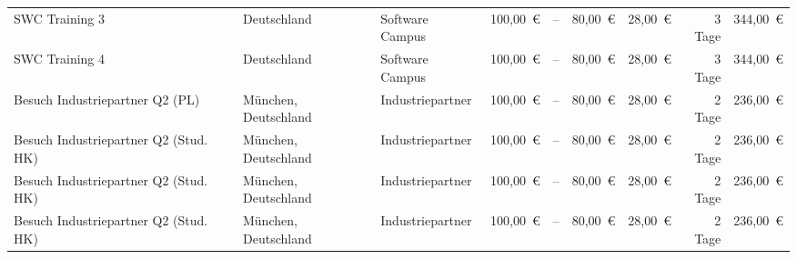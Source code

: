 \begin{table}[]
{\begin{tabular}{lllrrrrrr}
            SWC Training 3                        & Deutschland          & Software Campus    & 100,00~€                                                     & --                                                      & 80,00~€                                                & 28,00~€                                                   & 3 Tage                                                 & 344,00~€                                                \\
            SWC Training 4                        & Deutschland          & Software Campus    & 100,00~€                                                     & --                                                      & 80,00~€                                                & 28,00~€                                                   & 3 Tage                                                 & 344,00~€                                                \\
            Besuch Industriepartner Q2 (PL)       & München, Deutschland & Industriepartner   & 100,00~€                                                     & --                                                      & 80,00~€                                                & 28,00~€                                                   & 2 Tage                                                 & 236,00~€                                                \\
            Besuch Industriepartner Q2 (Stud. HK) & München, Deutschland & Industriepartner   & 100,00~€                                                     & --                                                      & 80,00~€                                                & 28,00~€                                                   & 2 Tage                                                 & 236,00~€                                                \\
            Besuch Industriepartner Q2 (Stud. HK) & München, Deutschland & Industriepartner   & 100,00~€                                                     & --                                                      & 80,00~€                                                & 28,00~€                                                   & 2 Tage                                                 & 236,00~€                                                \\
            Besuch Industriepartner Q2 (Stud. HK) & München, Deutschland & Industriepartner   & 100,00~€                                                     & --                                                      & 80,00~€                                                & 28,00~€                                                   & 2 Tage                                                 & 236,00~€                                                \\

\end{tabular}}
\end{table}
